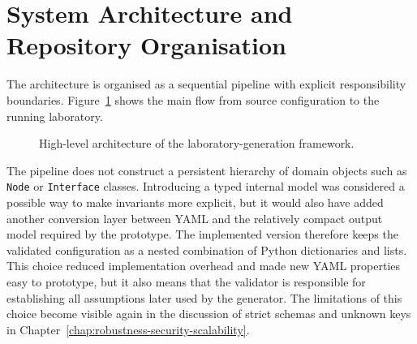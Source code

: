 \section{System Architecture and Repository Organisation}
\label{sec:system-architecture-repository}

The architecture is organised as a sequential pipeline with explicit
responsibility boundaries. Figure~\ref{fig:framework-architecture} shows the
main flow from source configuration to the running laboratory.

\begin{figure}[htbp]
\centering
{}
\caption{High-level architecture of the laboratory-generation framework.}
\label{fig:framework-architecture}
\end{figure}

The pipeline does not construct a persistent hierarchy of domain objects such
as \texttt{Node} or \texttt{Interface} classes. Introducing a typed internal
model was considered a possible way to make invariants more explicit, but it
would also have added another conversion layer between YAML and the relatively
compact output model required by the prototype. The implemented version
therefore keeps the validated configuration as a nested combination of Python
dictionaries and lists. This choice reduced implementation overhead and made
new YAML properties easy to prototype, but it also means that the validator is
responsible for establishing all assumptions later used by the generator. The
limitations of this choice become visible again in the discussion of strict
schemas and unknown keys in Chapter~\ref{chap:robustness-security-scalability}.

